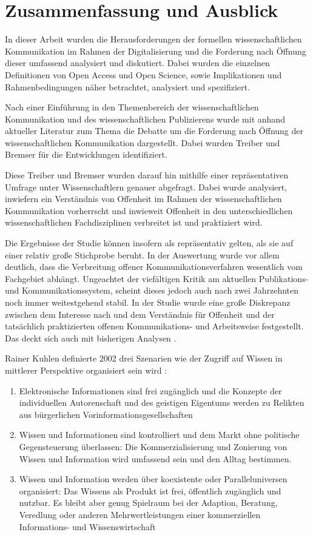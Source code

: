 \chapter{Zusammenfassung und Ausblick}

In dieser Arbeit wurden die Herausforderungen der formellen wissenschaftlichen Kommunikation im Rahmen der Digitalisierung und die Forderung nach Öffnung dieser umfassend analysiert und diskutiert. Dabei wurden die einzelnen Definitionen von Open Access und Open Science, sowie Implikationen und Rahmenbedingungen näher betrachtet, analysiert und spezifiziert.

Nach einer Einführung in den Themenbereich der wissenschaftlichen Kommunikation und des wissenschaftlichen Publizierens wurde mit anhand aktueller Literatur zum Thema die Debatte um die Forderung nach Öffnung der wissenschaftlichen Kommunikation dargestellt. Dabei wurden Treiber und Bremser für die Entwicklungen identifiziert.

Diese Treiber und Bremser wurden darauf hin mithilfe einer repräsentativen Umfrage unter Wissenschaftlern genauer abgefragt. Dabei wurde analysiert, inwiefern ein Verständnis von Offenheit im Rahmen der wissenschaftlichen Kommunikation vorherrscht und inwieweit Offenheit in den unterschiedlichen wissenschaftlichen Fachdisziplinen verbreitet ist und praktiziert wird.

Die Ergebnisse der Studie können insofern als repräsentativ gelten, als sie auf einer relativ große Stichprobe beruht. In der Auswertung wurde vor allem deutlich, dass die Verbreitung offener Kommunikationsverfahren wesentlich vom Fachgebiet abhängt. Ungeachtet der viefältigen Kritik am aktuellen Publikations- und Kommunikationssystem, scheint dieses jedoch auch nach zwei Jahrzehnten noch immer weitestgehend stabil. In der Studie wurde eine große Diskrepanz zwischen dem Interesse nach und dem Verständnis für Offenheit und der tatsächlich praktizierten offenen Kommunikations- und Arbeitsweise festgestellt. Das deckt sich auch mit bisherigen Analysen \cite{Bartling_2013}.

Rainer Kuhlen definierte 2002 drei Szenarien wie der Zugriff auf Wissen in mittlerer Perspektive organisiert sein wird \cite{Kuhlen_2002_universalaccess}:
\begin{enumerate}
\item Elektronische Informationen sind frei zugänglich und die Konzepte der individuellen Autorenschaft und des geistigen Eigentums werden zu Relikten aus bürgerlichen Vorinformationsgesellschaften
\item Wissen und Informationen sind kontrolliert und dem Markt ohne politische Gegensteuerung überlassen: Die Kommerzialisierung und Zonierung von Wissen und Information wird umfassend sein und den Alltag bestimmen.
\item Wissen und Information werden über koexistente oder Paralleluniversen organisiert: Das Wissens als Produkt ist frei, öffentlich zugänglich und nutzbar. Es bleibt aber genug Spielraum bei der Adaption, Beratung, Veredlung oder anderen Mehrwertleistungen einer kommerziellen Informations- und Wissenswirtschaft
\end{enumerate}

